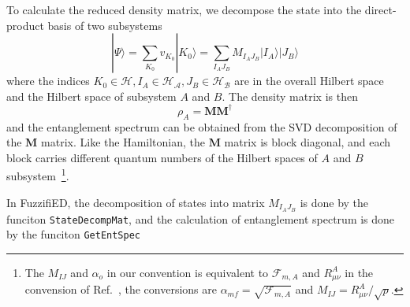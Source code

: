 \documentclass{timesjhep}
\begin{document}
To calculate the reduced density matrix, we decompose the state into the direct-product basis of two subsystems
\begin{equation}
    |\Psi\rangle=\sum_{K_0}v_{K_0}|K_0\rangle=\sum_{I_AJ_B}M_{I_AJ_B}|I_A\rangle|J_B\rangle
\end{equation}
where the indices $K_0\in\mathcal{H},I_A\in\mathscr{H_A},J_B\in\mathscr{H_B}$ are in the overall Hilbert space and the Hilbert space of subsystem $A$ and $B$. The density matrix is then 
\begin{equation}
    \rho_A=\mathbf{M}\mathbf{M}^\dagger
\end{equation}
and the entanglement spectrum can be obtained from the SVD decomposition of the $\mathbf{M}$ matrix. Like the Hamiltonian, the $\mathbf{M}$ matrix is block diagonal, and each block carries different quantum numbers of the Hilbert spaces of $A$ and $B$ subsystem~\footnote{The $M_{IJ}$ and $\alpha_o$ in our convention is equivalent to $\mathcal{F}_{m,A}$ and $R_{\mu\nu}^A$ in the convension of Ref.~\cite{Sterdyniak2011Entanglement}, the conversions are $\alpha_{mf}=\sqrt{\mathscr{F}_{m,A}}$ and $M_{IJ}=R_{\mu\nu}^A/\sqrt{p}$.}. 

In FuzzifiED, the decomposition of states into matrix $M_{I_AJ_B}$ is done by the funciton \lstinline|StateDecompMat|, and the calculation of entanglement spectrum is done by the funciton \lstinline|GetEntSpec|
\end{document}
